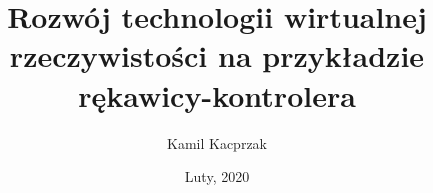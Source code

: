 \documentclass[inf, h]{pjatkThesis}
\author{Kamil Kacprzak}
\title{Rozwój technologii wirtualnej rzeczywistości na przykładzie rękawicy-kontrolera}
\date{Luty, 2020}
\begin{document}
\tableofcontents
\listoffigures


\cite{Tomaszewski2000}
\baselineskip=22pt




%



    
\end{document}
